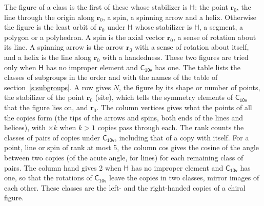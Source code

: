 \documentclass[10pt,a4paper]{article}
\numberwithin{equation}{section}
\newcommand{\grp}[1]{\mathsf{#1}}
\newcommand{\pointr}{\mathbf{r}}
\begin{document}
\leavevmode\label{n:head.figure}The figure of a class is the first of these whose stabilizer is $\grp{H}$: the point $\pointr_0$, the line through the origin along $\pointr_0$, a spin, a spinning arrow and a helix. Otherwise the figure is the least orbit of $\pointr_0$ under $\grp{H}$ whose stabilizer is $\grp{H}$, a segment, a polygon or a polyhedron. A spin is the axial vector $\pointr_0$, a sense of rotation about its line. A spinning arrow is the arrow $\pointr_0$ with a sense of rotation about itself, and a helix is the line along $\pointr_0$ with a handedness. These two figures are tried only when $\grp{H}$ has no improper element and $\grp{C_{10v}}$ has one. The table lists the classes of subgroups in the order and with the names of the table of section~\ref{s:subgroups}. \label{n:head.site}A row gives $N$, the figure by its shape or number of points, the stabilizer of the point $\pointr_0$ (site), which tells the symmetry elements of $\grp{C_{10v}}$ that the figure lies on, and $\pointr_0$. \label{n:head.vertices}The column vertices gives what the points of all the copies form (the tips of the arrows and spins, both ends of the lines and helices), with ${\times}k$ when $k > 1$ copies pass through each. \label{n:head.rank}The rank counts the classes of pairs of copies under $\grp{C_{10v}}$, including that of a copy with itself. \label{n:head.cos}For a point, line or spin of rank at most 5, the column cos gives the cosine of the angle between two copies (of the acute angle, for lines) for each remaining class of pairs. \label{n:head.hand}The column hand gives 2 when $\grp{H}$ has no improper element and $\grp{C_{10v}}$ has one, so that the rotations of $\grp{C_{10v}}$ leave the copies in two classes, mirror images of each other. These classes are the left- and the right-handed copies of a chiral figure.
\end{document}
